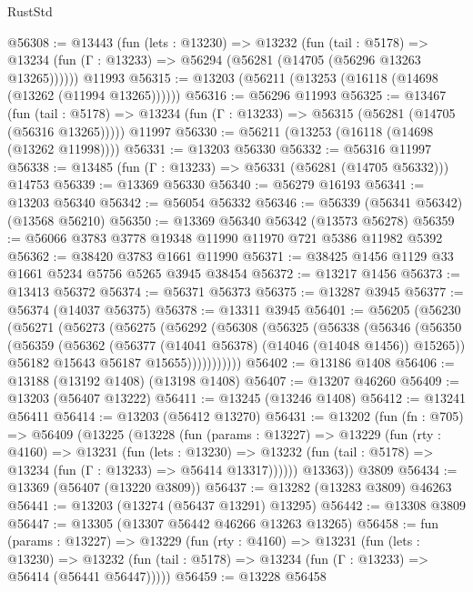 \begin{lexlean}{RustStd}
\begin{coremodule}
@56308 := @13443
    (fun (lets : @13230) =>
    @13232
      (fun (tail : @5178) =>
      @13234 (fun (Γ : @13233) => @56294 (@56281 (@14705 (@56296 @13263 @13265))))))
    @11993
@56315 := @13203 (@56211 (@13253 (@16118 (@14698 (@13262 (@11994 @13265))))))
@56316 := @56296 @11993
@56325 := @13467
    (fun (tail : @5178) => @13234 (fun (Γ : @13233) => @56315 (@56281 (@14705 (@56316 @13265)))))
    @11997
@56330 := @56211 (@13253 (@16118 (@14698 (@13262 @11998))))
@56331 := @13203 @56330
@56332 := @56316 @11997
@56338 := @13485 (fun (Γ : @13233) => @56331 (@56281 (@14705 @56332))) @14753
@56339 := @13369 @56330
@56340 := @56279 @16193
@56341 := @13203 @56340
@56342 := @56054 @56332
@56346 := @56339 (@56341 @56342) (@13568 @56210)
@56350 := @13369 @56340 @56342 (@13573 @56278)
@56359 := @56066 @3783 @3778 @19348 @11990 @11970 @721 @5386 @11982 @5392
@56362 := @38420 @3783 @1661 @11990
@56371 := @38425 @1456 @1129 @33 @1661 @5234 @5756 @5265 @3945 @38454
@56372 := @13217 @1456
@56373 := @13413 @56372
@56374 := @56371 @56373
@56375 := @13287 @3945
@56377 := @56374 (@14037 @56375)
@56378 := @13311 @3945
@56401 := @56205
    (@56230
      (@56271
        (@56273
          (@56275
            (@56292
              (@56308
                (@56325
                  (@56338
                    (@56346
                      (@56350
                        (@56359
                          (@56362 (@56377 (@14041 @56378) (@14046 (@14048 @1456)) @15265))
                          @56182
                          @15643
                          @56187
                          @15655)))))))))))
@56402 := @13186 @1408
@56406 := @13188 (@13192 @1408) (@13198 @1408)
@56407 := @13207 @46260
@56409 := @13203 (@56407 @13222)
@56411 := @13245 (@13246 @1408)
@56412 := @13241 @56411
@56414 := @13203 (@56412 @13270)
@56431 := @13202
    (fun (fn : @705) =>
    @56409
      (@13225
        (@13228
          (fun (params : @13227) =>
          @13229
            (fun (rty : @4160) =>
            @13231
              (fun (lets : @13230) =>
              @13232 (fun (tail : @5178) => @13234 (fun (Γ : @13233) => @56414 @13317))))))
        @13363))
    @3809
@56434 := @13369 (@56407 (@13220 @3809))
@56437 := @13282 (@13283 @3809) @46263
@56441 := @13203 (@13274 (@56437 @13291) @13295)
@56442 := @13308 @3809
@56447 := @13305 (@13307 @56442 @46266 @13263 @13265)
@56458 := fun (params : @13227) =>
  @13229
    (fun (rty : @4160) =>
    @13231
      (fun (lets : @13230) =>
      @13232 (fun (tail : @5178) => @13234 (fun (Γ : @13233) => @56414 (@56441 @56447)))))
@56459 := @13228 @56458

\end{coremodule}
\end{lexlean}
